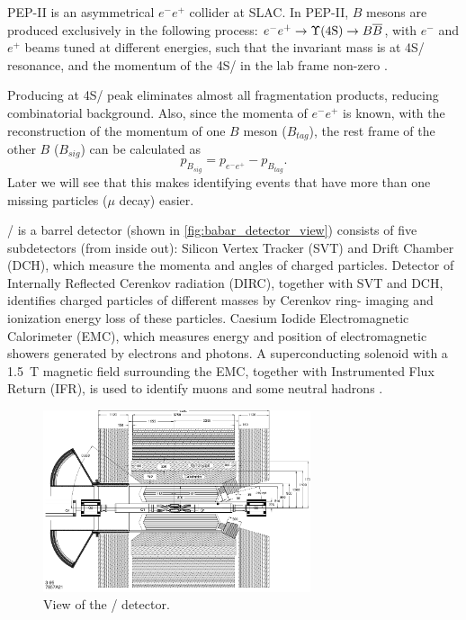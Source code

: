 PEP-II is an asymmetrical $e^- e^+$ collider at SLAC.
In PEP-II, $B$ mesons are produced exclusively in the following process:
$e^- e^+ \rightarrow \Y4S/ \rightarrow B \overline{B}$, with 
$e^-$ and $e^+$ beams tuned at different energies,
such that the invariant mass is at \Y4S/ resonance,
and the momentum of the \Y4S/ in the lab frame
non-zero \cite{Harrison:1998yr}.

Producing at \Y4S/ peak eliminates almost all fragmentation products, reducing combinatorial
background.
Also, since the momenta of $e^- e^+$ is known, with the reconstruction of the
momentum of one $B$ meson ($B_{tag}$), the rest frame of the other $B$ ($B_{sig}$) can 
be calculated as \cite{Harrison:1998yr}
\begin{equation}
    p_{B_{sig}} = p_{e^-e^+} - p_{B_{tag}}.
\end{equation}
Later we will see that this makes identifying events that have more than one missing particles
($\mu$ decay) easier.

\BaBar/ is a barrel detector (shown in \autoref{fig:babar_detector_view})
consists of five subdetectors (from inside out):
Silicon Vertex Tracker (SVT) and Drift Chamber (DCH), which measure the momenta
and angles of charged particles.
Detector of Internally Reflected Cerenkov radiation (DIRC), together with SVT
and DCH, identifies charged particles of different masses by Cerenkov ring-
imaging and ionization energy loss of these particles.
Caesium Iodide Electromagnetic Calorimeter (EMC), which measures energy and
position of electromagnetic showers generated by electrons and photons.
A superconducting solenoid with a \SI{1.5}{T} magnetic field surrounding the
EMC, together with Instrumented Flux Return (IFR), is used to identify muons and
some neutral hadrons \cite{Lees:2013uzd}.

\begin{figure}[ht]
    \centering
    \includegraphics[width=0.7\textwidth]{figs/babar_detector_view.pdf}
    \caption{
        View of the \BaBar/ detector.
    }
    \label{fig:babar_detector_view}
\end{figure}

